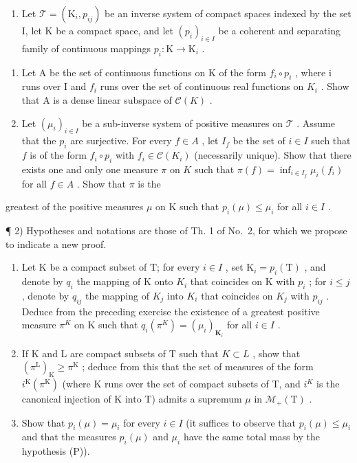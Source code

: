 \exercisesection{}

\begin{enumerate}
\def\labelenumi{\arabic{enumi})}
\tightlist
\item
  Let \(\mathcal{T} = (\mathrm{K}_i, p_{ij})\) be an inverse system of compact spaces indexed by the set I, let K be a compact space, and let \((p_i)_{i \in I}\) be a coherent and separating family of continuous mappings \(p_i: \mathrm{K} \to \mathrm{K}_i\) .
\end{enumerate}

\begin{enumerate}
\def\labelenumi{\alph{enumi})}
\item
  Let A be the set of continuous functions on K of the form \(f_{i} \circ p_{i}\) , where i runs over I and \(f_{i}\) runs over the set of continuous real functions on \(K_{i}\) . Show that A is a dense linear subspace of \(\mathcal{C}(K)\) .
\item
  Let \((\mu_i)_{i \in I}\) be a sub-inverse system of positive measures on \(\mathcal{T}\) . Assume that the \(p_i\) are surjective. For every \(f \in A\) , let \(I_f\) be the set of \(i \in I\) such that \(f\) is of the form \(f_i \circ p_i\) with \(f_i \in \mathcal{C}(K_i)\) (necessarily unique). Show that there exists one and only one measure \(\pi\) on \(K\) such that \(\pi(f) = \inf_{i \in I_f} \mu_i(f_i)\) for all \(f \in A\) . Show that \(\pi\) is the
\end{enumerate}

greatest of the positive measures \(\mu\) on K such that \(p_i(\mu) \leqslant \mu_i\) for all \(i \in I\) .

¶ 2) Hypotheses and notations are those of Th. 1 of No.~2, for which we propose to indicate a new proof.

\begin{enumerate}
\def\labelenumi{\alph{enumi})}
\item
  Let K be a compact subset of T; for every \(i \in I\) , set \(\mathrm{K}_{i} = p_{i}(\mathrm{T})\) , and denote by \(q_{i}\) the mapping of K onto \(K_{i}\) that coincides on K with \(p_{i}\) ; for \(i \leqslant j\) , denote by \(q_{ij}\) the mapping of \(K_{j}\) into \(K_{i}\) that coincides on \(K_{j}\) with \(p_{ij}\) . Deduce from the preceding exercise the existence of a greatest positive measure \(\pi^{K}\) on K such that \(q_{i}(\pi^{K}) = (\mu_{i})_{\mathbf{K}_{i}}\) for all \(i \in I\) .
\item
  If K and L are compact subsets of T such that \(K \subset L\) , show that \((\pi^{\mathrm{L}})_{\mathrm{K}} \geqslant \pi^{\mathrm{K}}\) ; deduce from this that the set of measures of the form \(i^{\mathrm{K}}(\pi^{\mathrm{K}})\) (where K runs over the set of compact subsets of T, and \(i^{K}\) is the canonical injection of K into T) admits a supremum \(\mu\) in \(\mathcal{M}_{+}(\mathrm{T})\) .
\item
  Show that \(p_i(\mu) = \mu_i\) for every \(i \in I\) (it suffices to observe that \(p_i(\mu) \leqslant \mu_i\) and that the measures \(p_i(\mu)\) and \(\mu_i\) have the same total mass by the hypothesis (P)).
\end{enumerate}


